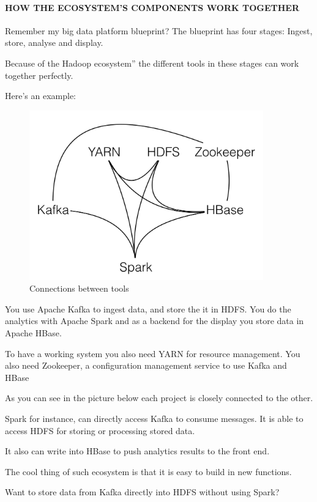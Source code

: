 \documentclass[12pt]{scrartcl} %
\begin{document}
\paragraph{HOW THE ECOSYSTEM’S COMPONENTS WORK TOGETHER}
Remember my big data platform blueprint? The blueprint has four stages: Ingest, store, analyse and display.

Because of the Hadoop ecosystem” the different tools in these stages can work together perfectly.

Here’s an example:
\begin{figure}[htbp]
  \centering
     \includegraphics[width=0.9\textwidth]{images/Hadoop-Ecosystem-Connections.png}
  \caption{Connections between tools}
  \label{fig:Bild1}
\end{figure}

You use Apache Kafka to ingest data, and store the it in HDFS. You do the analytics with Apache Spark and as a backend for the display you store data in Apache HBase.

To have a working system you also need YARN for resource management. You also need Zookeeper, a configuration management service to use Kafka and HBase

As you can see in the picture below each project is closely connected to the other.

Spark for instance, can directly access Kafka to consume messages. It is able to access HDFS for storing or processing stored data.

It also can write into HBase to push analytics results to the front end.


The cool thing of such ecosystem is that it is easy to build in new functions.

Want to store data from Kafka directly into HDFS without using Spark?
\end{document}
